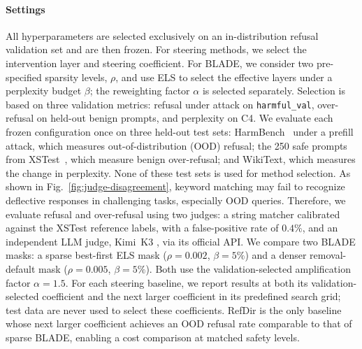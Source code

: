 \paragraph{Settings}
All hyperparameters are selected exclusively on an in-distribution refusal validation set and are then frozen. For steering methods, we select the intervention layer and steering coefficient. For BLADE, we consider two pre-specified sparsity levels, $\rho$, and use ELS to select the effective layers under a perplexity budget $\beta$; the reweighting factor $\alpha$ is selected separately. Selection is based on three validation metrics: refusal under attack on \texttt{harmful\_val}, over-refusal on held-out benign prompts, and perplexity on C4.
We evaluate each frozen configuration once on three held-out test sets: HarmBench~\cite{mazeika2024harmbench} under a prefill attack, which measures out-of-distribution (OOD) refusal; the 250 safe prompts from XSTest~\cite{rottger2024xstest}, which measure benign over-refusal; and WikiText, which measures the change in perplexity. None of these test sets is used for method selection.
As shown in Fig.~\ref{fig:judge-disagreement}, keyword matching may fail to recognize deflective responses in challenging tasks, especially OOD queries. Therefore, we evaluate refusal and over-refusal using two judges: a string matcher calibrated against the XSTest reference labels, with a false-positive rate of $0.4\%$, and an independent LLM judge, Kimi~K3 \cite{kimiteam2026kimik3}, via its official API. We compare two BLADE masks: a sparse best-first ELS mask ($\rho{=}0.002$, $\beta{=}5\%$) and a denser removal-default mask ($\rho{=}0.005$, $\beta{=}5\%$). Both use the validation-selected amplification factor $\alpha{=}1.5$. For each steering baseline, we report results at both its validation-selected coefficient and the next larger coefficient in its predefined search grid; test data are never used to select these coefficients. RefDir is the only baseline whose next larger coefficient achieves an OOD refusal rate comparable to that of sparse BLADE, enabling a cost comparison at matched safety levels.

